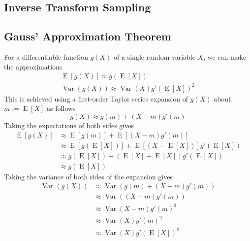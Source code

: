 \documentclass[11pt]{report} %
\begin{document}
\subsection{Inverse Transform Sampling}

\subsection{Gauss' Approximation Theorem \cite{Blom1989}}

For a differentiable function $g\left(X\right)$ of a single random variable $X$, we can make the approximations
\begin{gather}
\operatorname{E}\left[g\left(X\right)\right] \approx g\left(\operatorname{E}\left[X\right]\right) \\
\operatorname{Var}\left(g\left(X\right)\right) \approx \operatorname{Var}\left(X\right)g'\left(\operatorname{E}\left[X\right]\right)^{2}
\end{gather}
This is achieved using a first-order Taylor series expansion of $g\left(X\right)$ about $m := \operatorname{E}\left[X\right]$ as follows
\begin{equation}
g\left(X\right) \approx g\left(m\right) + \left(X - m\right)g'\left(m\right)
\end{equation}
Taking the expectations of both sides gives
\begin{align}
\operatorname{E}\left[g\left(X\right)\right] &\approx \operatorname{E}\left[g\left(m\right)\right] + \operatorname{E}\left[\left(X - m\right)g'\left(m\right)\right] \\
&\approx \operatorname{E}\left[g\left(\operatorname{E}\left[X\right]\right)\right] + \operatorname{E}\left[\left(X - \operatorname{E}\left[X\right]\right)\right]g'\left(\operatorname{E}\left[X\right]\right) \\
&\approx g\left(\operatorname{E}\left[X\right]\right) + \left(\operatorname{E}\left[X\right] - \operatorname{E}\left[X\right]\right)g'\left(\operatorname{E}\left[X\right]\right) \\
&\approx g\left(\operatorname{E}\left[X\right]\right)
\end{align}
Taking the variance of both sides of the expansion gives
\begin{align}
\operatorname{Var}\left(g\left(X\right)\right) &\approx \operatorname{Var}\left(g\left(m\right) + \left(X - m\right)g'\left(m\right)\right) \\
&\approx \operatorname{Var}\left(\left(X - m\right)g'\left(m\right)\right) \\
&\approx \operatorname{Var}\left(X - m\right)g'\left(m\right)^{2} \\
&\approx \operatorname{Var}\left(X\right)g'\left(m\right)^{2} \\
&\approx \operatorname{Var}\left(X\right)g'\left(\operatorname{E}\left[X\right]\right)^{2} 
\end{align}
\end{document}

